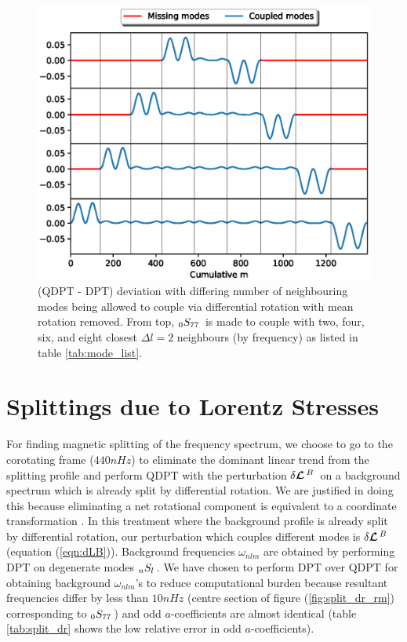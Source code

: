 \begin{figure}[h]
\includegraphics[scale=0.9, center]{Chapter4/figs/qdpt_err}
\caption{(QDPT - DPT) deviation with differing number of neighbouring modes being allowed to couple via differential rotation with mean rotation removed. From top, $_{0}S_{77}\,$ is made to couple with two, four, six, and eight closest $\Delta l=2$ neighbours (by frequency) as listed in table \ref{tab:mode_list}.}
\label{fig:DPT_err} 
\end{figure}

\section{Splittings due to Lorentz Stresses} %

For finding magnetic splitting of the frequency spectrum, we choose to go to the corotating frame ($440 nHz$) to eliminate the dominant linear trend from the splitting profile and perform QDPT with the perturbation $\delta \bm{\mathcal{L}}\,^{B}\,$ on a background spectrum which is already split by differential rotation. We are justified in doing this because eliminating a net rotational component is equivalent to a coordinate transformation \cite{jcd_notes}. In this treatment where the background profile is already  split by differential rotation, our perturbation which couples different modes is $\delta \bm{\mathcal{L}}\,^{B}\,$ (equation  (\ref{eqn:dLB})). Background frequencies $\omega_{nlm}$ are obtained by performing DPT on degenerate modes $_{n}S_{l}\,$. We have chosen to perform DPT over QDPT for obtaining background $\omega_{nlm}$'s to reduce computational burden because resultant frequencies differ by less than $10nHz$ (centre section of figure (\ref{fig:split_dr_rm}) corresponding to $_{0}S_{77}\,$) and odd $a$-coefficients are almost identical (table \ref{tab:split_dr} shows the low relative error in odd $a$-coefficients).

